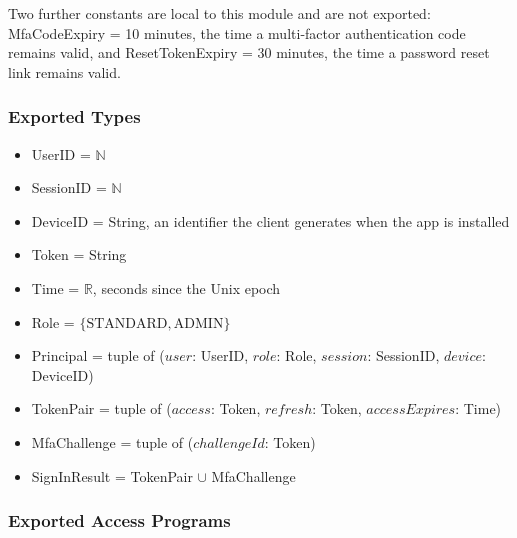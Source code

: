 \documentclass[12pt, titlepage]{article}
\begin{document}
\noindent Two further constants are local to this module and are not exported:
\textsf{MfaCodeExpiry} = 10 minutes, the time a multi-factor authentication
code remains valid, and \textsf{ResetTokenExpiry} = 30 minutes, the time a
password reset link remains valid.

\subsubsection{Exported Types}

\begin{itemize}
\item UserID = $\mathbb{N}$
\item SessionID = $\mathbb{N}$
\item DeviceID = String, an identifier the client generates when the app is
  installed
\item Token = String
\item Time = $\mathbb{R}$, seconds since the Unix epoch
\item Role = $\{\mathrm{STANDARD}, \mathrm{ADMIN}\}$
\item Principal = tuple of ($\mathit{user}$: UserID, $\mathit{role}$: Role,
  $\mathit{session}$: SessionID, $\mathit{device}$: DeviceID)
\item TokenPair = tuple of ($\mathit{access}$: Token, $\mathit{refresh}$:
  Token, $\mathit{accessExpires}$: Time)
\item MfaChallenge = tuple of ($\mathit{challengeId}$: Token)
\item SignInResult = TokenPair $\cup$ MfaChallenge
\end{itemize}

\subsubsection{Exported Access Programs}
\end{document}
